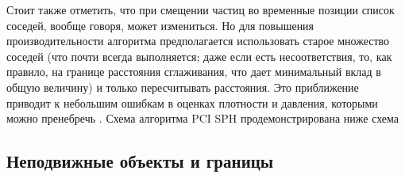 Стоит также отметить, что при смещении частиц во временные позиции список соседей, вообще говоря, может измениться. Но для повышения производительности алгоритма предполагается использовать старое множество соседей (что почти всегда выполняется; даже если есть несоответствия, то, как правило, на границе расстояния сглаживания, что дает минимальный вклад в общую величину) и только пересчитывать расстояния. Это приближение приводит к небольшим ошибкам в оценках плотности и давления, которыми можно пренебречь \cite{Solenthaler2009}. Схема алгоритма PCI SPH продемонстрирована ниже схема


\subsection{Неподвижные объекты и границы}\label{subsec:ch1/sec4/sub2}

